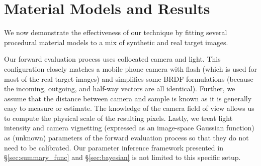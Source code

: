 \section{Material Models and Results}
\label{sec:results}
%
We now demonstrate the effectiveness of our technique by fitting %
several procedural material models to a mix of synthetic and real target images.

Our forward evaluation process uses collocated camera and light.
This configuration closely matches a mobile phone camera with flash (which is used for most of the real target images) and simplifies some BRDF formulations (because the incoming, outgoing, and half-way vectors are all identical).
Further, we assume that the distance between camera and sample is known as it is generally easy to measure or estimate.
The knowledge of the camera field of view allows us to compute the physical scale of the resulting pixels.
Lastly, we treat light intensity and camera vignetting (expressed as an image-space Gaussian function) as (unknown) parameters of the forward evaluation process so that they do not need to be calibrated.
Our parameter inference framework presented in \S\ref{sec:summary_func} and \S\ref{sec:bayesian} is not limited to this specific setup.


